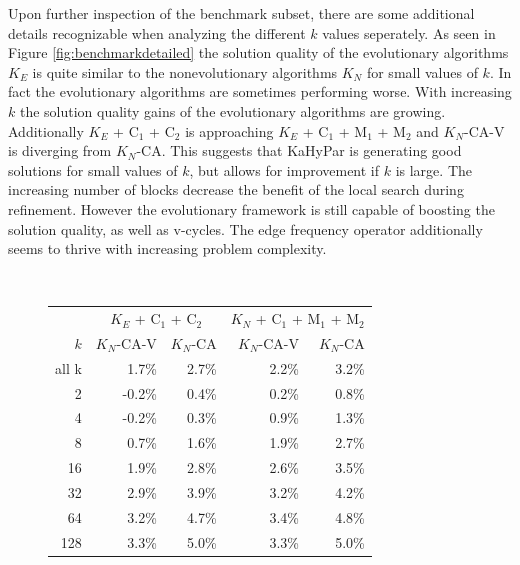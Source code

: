 \documentclass[a4paper,12pt,titlepage, BCOR7mm,headsepline]{scrbook}
\numberwithin{equation}{section}
\begin{document}
Upon further inspection of the benchmark subset, there are some additional details recognizable when analyzing the different $k$ values seperately. As seen in Figure \ref{fig:benchmarkdetailed} the solution quality of the evolutionary algorithms $K_E$ is quite similar to the nonevolutionary algorithms $K_N$ for small values of $k$. In fact the evolutionary algorithms are sometimes performing worse. With increasing $k$ the solution quality gains of the evolutionary algorithms are growing. Additionally $K_E$ + C$_1$ + C$_2$ is approaching $K_E$ + C$_1$ + M$_1$ + M$_2$ and $K_N$-CA-V is diverging from $K_N$-CA. This suggests that KaHyPar is generating good solutions for small values of $k$, but allows for improvement if $k$ is large. The increasing number of blocks 
decrease the benefit of the local search during refinement. However the evolutionary framework is still capable of boosting the solution quality, as well as v-cycles. The edge frequency operator additionally seems to thrive with increasing problem complexity. 
\begin{figure}[H]


\centering
\vspace{0pt}
~\label{tbl:imp}
\begin{tabular}[H]{r||r|r||r|r}\label{tab:improvement}
&\multicolumn{2}{c||}{$K_E$ + C$_1$ + C$_2$} & \multicolumn{2}{c}{$K_N$ + C$_1$ + M$_1$ + M$_2$} \\
$k$                     &                              $K_N$-CA-V    & $K_N$-CA &  $K_N$-CA-V  & $K_N$-CA  \\ 
                     \hline
                     \hline

all k &  1.7\% & 2.7\% & 2.2\% & 3.2\% \\
\hline
2&-0.2\% & 0.4\% & 0.2\% & 0.8\% \\
4& -0.2\% &0.3\% &0.9\% &1.3\%\\
8& 0.7\% &1.6\%& 1.9\% &2.7\%\\
16& 1.9\% &2.8\%& 2.6\%& 3.5\%\\
32& 2.9\% &3.9\%& 3.2\%& 4.2\%\\
64&  3.2\% &4.7\%& 3.4\% &4.8\%\\
128&%
      3.3\%
&5.0\%
& 3.3\% &5.0\% \\ 
\end{tabular}

\end{figure}
\end{document}
